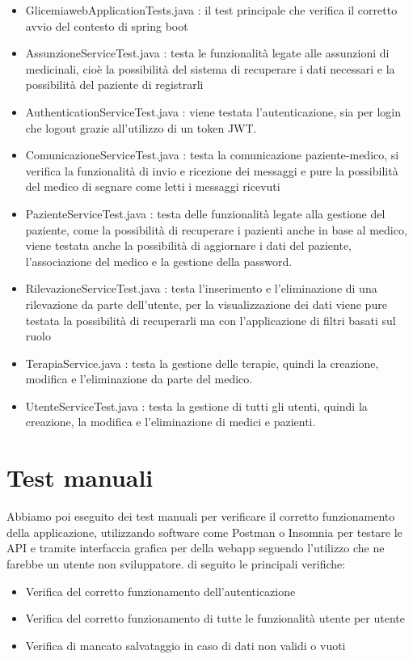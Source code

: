 \documentclass{report}
\begin{document}
\begin{itemize}
    \item GlicemiawebApplicationTests.java : il test principale che verifica
    il corretto avvio del contesto di spring boot
    \item AssunzioneServiceTest.java : testa le funzionalità legate alle assunzioni
    di medicinali, cioè la possibilità del sistema di recuperare i dati necessari
    e la possibilità del paziente di registrarli
    \item AuthenticationServiceTest.java : viene testata l'autenticazione, sia
    per login che logout grazie all'utilizzo di un token JWT.
    \item ComunicazioneServiceTest.java : testa la comunicazione paziente-medico,
    si verifica la funzionalità di invio e ricezione dei messaggi e pure la possibilità
    del medico di segnare come letti i messaggi ricevuti
    \item PazienteServiceTest.java : testa delle funzionalità legate alla gestione
    del paziente, come la possibilità di recuperare i pazienti anche in base al medico,
    viene testata anche la possibilità di aggiornare i dati del paziente, l'associazione
    del medico e la gestione della password.
    \item RilevazioneServiceTest.java : testa l'inserimento e l'eliminazione di 
    una rilevazione da parte dell'utente, per la visualizzazione dei dati viene
    pure testata la possibilità di recuperarli ma con l'applicazione di filtri basati
    sul ruolo
    \item TerapiaService.java : testa la gestione delle terapie, quindi la creazione, modifica
    e l'eliminazione da parte del medico.
    \item UtenteServiceTest.java : testa la gestione di tutti gli utenti, quindi la creazione,
    la modifica e l'eliminazione di medici e pazienti.
\end{itemize}

\section{Test manuali}
Abbiamo poi eseguito dei test manuali per verificare il corretto funzionamento della applicazione, utilizzando
software come Postman o Insomnia per testare le API e tramite interfaccia grafica per della webapp seguendo l'utilizzo che ne farebbe un utente non sviluppatore.
di seguito le principali verifiche:
\begin{itemize}
    \item Verifica del corretto funzionamento dell'autenticazione
    \item Verifica del corretto funzionamento di tutte le funzionalità utente per utente
    \item Verifica di mancato salvataggio in caso di dati non validi o vuoti
\end{itemize}
\end{document}
